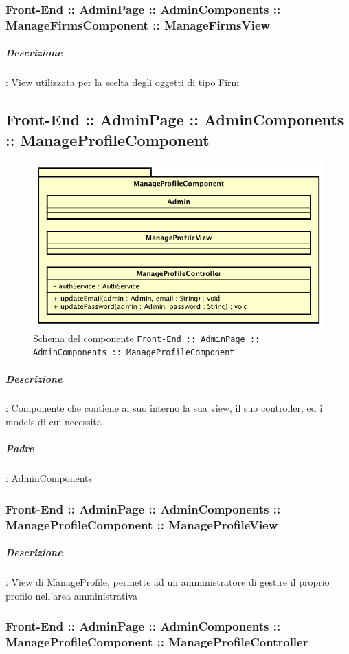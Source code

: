 \documentclass[../ManualeSviluppatore_v2.0.0.tex]{subfiles}
\begin{document}
				\subsubsection{Front-End :: AdminPage :: AdminComponents :: ManageFirmsComponent :: ManageFirmsView}
					\subparagraph{Descrizione}: View utilizzata per la scelta degli oggetti di tipo Firm


	\newpage
	\subsection{Front-End :: AdminPage :: AdminComponents :: ManageProfileComponent}
	\begin{figure}[!h]
		\centering
		\includegraphics[scale=0.6]{Architettura/Front-End/AdminPage/AdminComponents/ManageProfileComponent.png}
		\caption{Schema del componente \texttt{Front-End :: AdminPage :: AdminComponents :: ManageProfileComponent}}
	\end{figure}
			\subparagraph{Descrizione}: Componente che contiene al suo interno la sua view, il suo controller, ed i models di cui necessita
			\subparagraph{Padre}: AdminComponents
				\subsubsection{Front-End :: AdminPage :: AdminComponents :: ManageProfileComponent :: ManageProfileView}
					\subparagraph{Descrizione}: View di ManageProfile, permette ad un amministratore di gestire il proprio profilo nell'area amministrativa
				\subsubsection{Front-End :: AdminPage :: AdminComponents :: ManageProfileComponent :: ManageProfileController}
\end{document}
